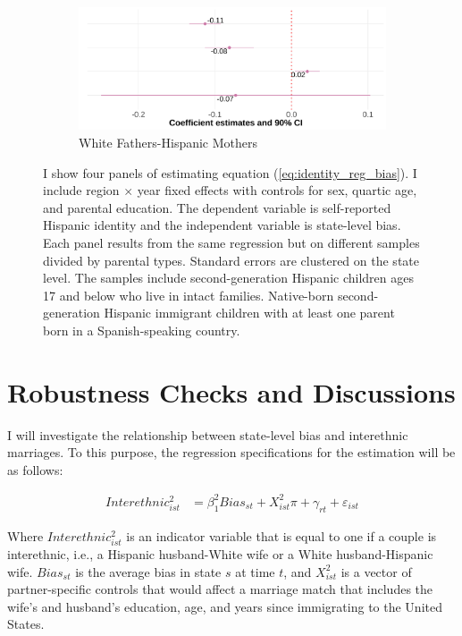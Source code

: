 \documentclass[12pt,english]{article}
\begin{document}
\begin{center}
\begin{figure}[!htb]
\begin{subfigure}{.48\textwidth}
\caption{White Fathers-Hispanic Mothers}
\centering
\includegraphics[width=.9\linewidth]{figure/by-parents-regs-wh.png}
\end{subfigure}
\caption*{\footnotesize{I show four panels of estimating equation (\ref{eq:identity_reg_bias}). I include region $\times$ year fixed effects with controls for sex, quartic age, and parental education. The dependent variable is self-reported Hispanic identity and the independent variable is state-level bias. Each panel results from the same regression but on different samples divided by parental types. Standard errors are clustered on the state level. The samples include second-generation Hispanic children ages 17 and below who live in intact families. Native-born second-generation Hispanic immigrant children with at least one parent born in a Spanish-speaking country.}}
\end{figure}
\end{center}

\pagebreak
\newpage




\pagebreak
\newpage

\section{Robustness Checks and Discussions} %
\label{sec:results}

I will investigate the relationship between state-level bias and interethnic marriages. To this purpose, the regression specifications for the estimation will be as follows:

\begin{align}
Interethnic_{ist}^2 &= \beta_1^2 Bias_{st} + X_{ist}^2\pi + \gamma_{rt} 
            + \varepsilon_{ist}  \label{eq:inter-interethnic} 
\end{align}

Where $Interethnic_{ist}^2$ is an indicator variable that is equal to one if a couple is interethnic, i.e., a Hispanic husband-White wife or a White husband-Hispanic wife. $Bias_{st}$ is the average bias in state $s$ at time $t$, and $X_{ist}^2$ is a vector of partner-specific controls that would affect a marriage match that includes the wife's and husband's education, age, and years since immigrating to the United States. 
\end{document}
